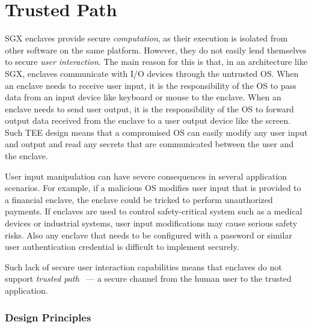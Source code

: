 
\section*{Trusted Path}

SGX enclaves provide secure \emph{computation}, as their execution is isolated from other software on the same platform. However, they do not easily lend themselves to secure \emph{user interaction}. The main reason for this is that, in an architecture like SGX, enclaves communicate with I/O devices through the untrusted OS. When an enclave needs to receive user input, it is the responsibility of the OS to pass data from an input device like keyboard or mouse to the enclave. When an enclave needs to send user output, it is the responsibility of the OS to forward output data received from the enclave to a user output device like the screen. Such TEE design means that a compromised OS can easily modify any user input and output and read any secrets that are communicated between the user and the enclave. 

User input manipulation can have severe consequences in several application scenarios. For example, if a malicious OS modifies user input that is provided to a financial enclave, the enclave could be tricked to perform unauthorized payments. If enclaves are used to control safety-critical system such as a medical devices or industrial systems, user input modifications may cause serious safety risks. Also any enclave that needs to be configured with a password or similar user authentication credential is difficult to implement securely.

Such lack of secure user interaction capabilities means that enclaves do not support \emph{trusted path}~\cite{x86} --- a secure channel from the human user to the trusted application. 



\subsubsection*{Design Principles}

